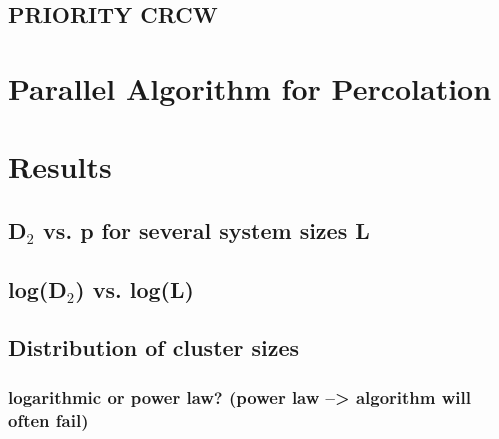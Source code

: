 \documentclass{umthesis}
\begin{document}
\subsection{PRIORITY CRCW}
\label{sec-4.3.2}
\section{Parallel Algorithm for Percolation}
\label{sec-4.4}
\section{Results}
\label{sec-4.5}
\subsection{D$_2$ vs. p for several system sizes L}
\label{sec-4.5.1}
\subsection{log(D$_2$) vs. log(L)}
\label{sec-4.5.2}
\subsection{Distribution of cluster sizes}
\label{sec-4.5.3}
\subsubsection{logarithmic or power law? (power law --> algorithm will often fail)}
\label{sec-4.5.3.1}






 
\end{document}
